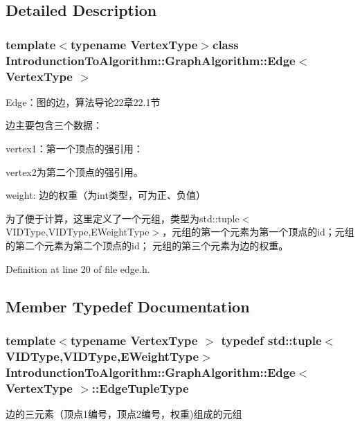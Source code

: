 \subsection{Detailed Description}
\subsubsection*{template$<$typename Vertex\+Type$>$class Introdunction\+To\+Algorithm\+::\+Graph\+Algorithm\+::\+Edge$<$ Vertex\+Type $>$}

Edge：图的边，算法导论22章22.1节 

边主要包含三个数据：


\begin{DoxyItemize}
\item {\ttfamily vertex1}：第一个顶点的强引用：
\item {\ttfamily vertex2}为第二个顶点的强引用。
\item {\ttfamily weight}\+: 边的权重（为int类型，可为正、负值）
\end{DoxyItemize}

为了便于计算，这里定义了一个元组，类型为{\ttfamily std\+::tuple$<$V\+I\+D\+Type,V\+I\+D\+Type,E\+Weight\+Type$>$}，元组的第一个元素为第一个顶点的{\ttfamily id}；元组的第二个元素为第二个顶点的{\ttfamily id}； 元组的第三个元素为边的权重。 

Definition at line 20 of file edge.\+h.



\subsection{Member Typedef Documentation}
\hypertarget{class_introdunction_to_algorithm_1_1_graph_algorithm_1_1_edge_adaaedd6d4205248ecf521e8585a2ecf6}{}
\subsubsection[{Edge\+Tuple\+Type}]{\setlength{\rightskip}{0pt plus 5cm}template$<$typename Vertex\+Type $>$ typedef std\+::tuple$<${\bf V\+I\+D\+Type},{\bf V\+I\+D\+Type},{\bf E\+Weight\+Type}$>$ {\bf Introdunction\+To\+Algorithm\+::\+Graph\+Algorithm\+::\+Edge}$<$ Vertex\+Type $>$\+::{\bf Edge\+Tuple\+Type}}\label{class_introdunction_to_algorithm_1_1_graph_algorithm_1_1_edge_adaaedd6d4205248ecf521e8585a2ecf6}
边的三元素（顶点1编号，顶点2编号，权重)组成的元组 

